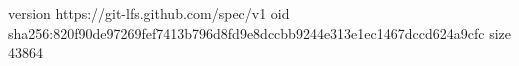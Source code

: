 version https://git-lfs.github.com/spec/v1
oid sha256:820f90de97269fef7413b796d8fd9e8dccbb9244e313e1ec1467dccd624a9cfc
size 43864
